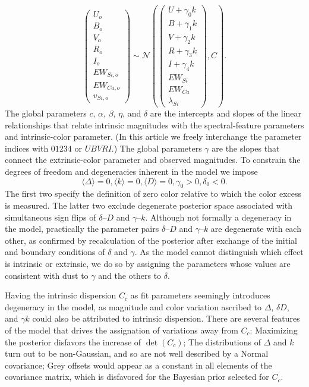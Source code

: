 \documentclass{aastex}   	%
\begin{document}
\begin{equation}
\begin{pmatrix}
U_o\\B_o\\ V_o\\R_o\\I_o\\EW_{Si, o}\\ EW_{Ca, o} \\ v_{Si, o}
\end{pmatrix}
\sim \mathcal{N}
\left(
\begin{pmatrix}
U +\gamma_0 k \\B +\gamma_1 k \\V+\gamma_2 k\\R+\gamma_3 k\\I+\gamma_4 k\\
EW_{Si}\\ EW_{Ca} \\ \lambda_{Si}
\end{pmatrix}
,C
\right).
\label{dust:eqn}
\end{equation}
The global parameters $c$, $\alpha$, $\beta$, $\eta$, and $\delta$  are the intercepts and slopes of the linear relationships that
relate intrinsic magnitudes with the spectral-feature parameters and intrinsic-color parameter.
(In this article we freely interchange the parameter indices with  $01234$ or $UBVRI$.)
The global parameters $\gamma$ are the slopes that connect the extrinsic-color
parameter and observed magnitudes.  To constrain the degrees of freedom and degeneracies inherent in the model we impose
\begin{equation}
\langle \Delta \rangle=0, \langle k \rangle=0, \langle D \rangle=0, \gamma_0 > 0, \delta_0 < 0.
\end{equation}
The first two specify the definition of zero color relative to which the color excess is measured.    The latter two exclude degenerate posterior space
associated
with  simultaneous sign flips of
$\delta$--$D$ and $\gamma$--$k$.
Although not formally a degeneracy in the model, practically the parameter pairs  $\delta$--$D$ and $\gamma$--$k$ are degenerate with
each other,
as confirmed by recalculation of the posterior after exchange of the initial  and boundary conditions of $\delta$ and $\gamma$.
As the model cannot distinguish which effect is intrinsic or extrinsic, we do so
by assigning the parameters whose values are consistent with dust to $\gamma$ and the others to $\delta$.


Having the intrinsic dispersion $C_c$ as fit parameters seemingly introduces degeneracy in the model, as magnitude and color variation
ascribed to $\Delta$, $\delta D$, and $\gamma k$ could also be attributed to intrinsic dispersion.  There are several features of the model
that drives the assignation of variations away from $C_c$:  Maximizing the posterior disfavors the increase of $\det{(C_c)}$;
The distributions of $\Delta$ and $k$ turn out to
be non-Gaussian, and so are not well described by a Normal covariance; Grey offsets would appear as a constant
in all elements of the covariance matrix, which is disfavored for the Bayesian prior selected for $C_c$.
\end{document}
